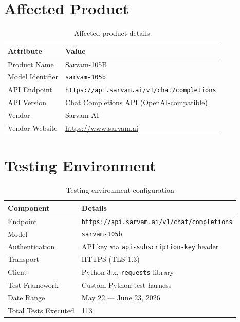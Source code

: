 \documentclass[11pt,a4paper]{article}
\begin{document}
\section{Affected Product}

\begin{table}[H]
\centering
\begin{tabularx}{\textwidth}{|l|X|}
\hline
\textbf{Attribute} & \textbf{Value} \\
\hline
Product Name & Sarvam-105B \\
\hline
Model Identifier & \texttt{sarvam-105b} \\
\hline
API Endpoint & \texttt{https://api.sarvam.ai/v1/chat/completions} \\
\hline
API Version & Chat Completions API (OpenAI-compatible) \\
\hline
Vendor & Sarvam AI \\
\hline
Vendor Website & \url{https://www.sarvam.ai} \\
\hline
\end{tabularx}
\caption{Affected product details}
\end{table}

\section{Testing Environment}

\begin{table}[H]
\centering
\begin{tabularx}{\textwidth}{|l|X|}
\hline
\textbf{Component} & \textbf{Details} \\
\hline
Endpoint & \texttt{https://api.sarvam.ai/v1/chat/completions} \\
\hline
Model & \texttt{sarvam-105b} \\
\hline
Authentication & API key via \texttt{api-subscription-key} header \\
\hline
Transport & HTTPS (TLS 1.3) \\
\hline
Client & Python 3.x, \texttt{requests} library \\
\hline
Test Framework & Custom Python test harness \\
\hline
Date Range & May 22 --- June 23, 2026 \\
\hline
Total Tests Executed & 113 \\
\hline
\end{tabularx}
\caption{Testing environment configuration}
\end{table}
\end{document}
